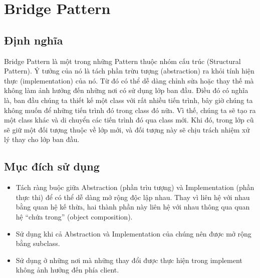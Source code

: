 \chapter{Bridge Pattern}

\section{Định nghĩa}
Bridge Pattern là một trong những Pattern thuộc nhóm cấu trúc (Structural Pattern). Ý tưởng của nó là tách phần trừu tượng (abstraction) ra khỏi tính hiện thực (implementation) của nó. Từ đó có thể dễ dàng chỉnh sửa hoặc thay thế mà không làm ảnh hưởng đến những nơi có sử dụng lớp ban đầu. Điều đó có nghĩa là, ban đầu chúng ta thiết kế một class với rất nhiều tiến trình, bây giờ chúng ta không muốn để những tiến trình đó trong class đó nữa. Vì thế, chúng ta sẽ tạo ra một class khác và di chuyển các tiến trình đó qua class mới. Khi đó, trong lớp cũ sẽ giữ một đối tượng thuộc về lớp mới, và đối tượng này sẽ chịu trách nhiệm xử lý thay cho lớp ban đầu.

\section{Mục đích sử dụng}
\begin{itemize}
\item Tách ràng buộc giữa Abstraction (phần trìu tượng) và Implementation (phần thực thi) để có thể dễ dàng mở rộng độc lập nhau. Thay vì liên hệ với nhau bằng quan hệ kế thừa, hai thành phần này liên hệ với nhau thông qua quan hệ “chứa trong” (object composition).
\item Sử dụng khi cả Abstraction và Implementation của chúng nên được mở rộng bằng subclass.
\item Sử dụng ở những nơi mà những thay đổi được thực hiện trong implement không ảnh hưởng đến phía client.
\end{itemize}

